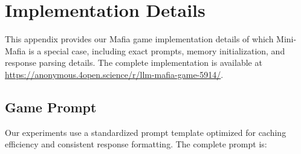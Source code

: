 \documentclass{article}
\begin{document}






\appendix

\section{Implementation Details}
\label{appendix:experimental_details}

This appendix provides our Mafia game implementation details of which Mini-Mafia is a special case, including exact prompts, memory initialization, and response parsing details. The complete implementation is available at \url{https://anonymous.4open.science/r/llm-mafia-game-5914/}.

\subsection{Game Prompt}

Our experiments use a standardized prompt template optimized for caching efficiency and consistent response formatting. The complete prompt is:
\end{document}
